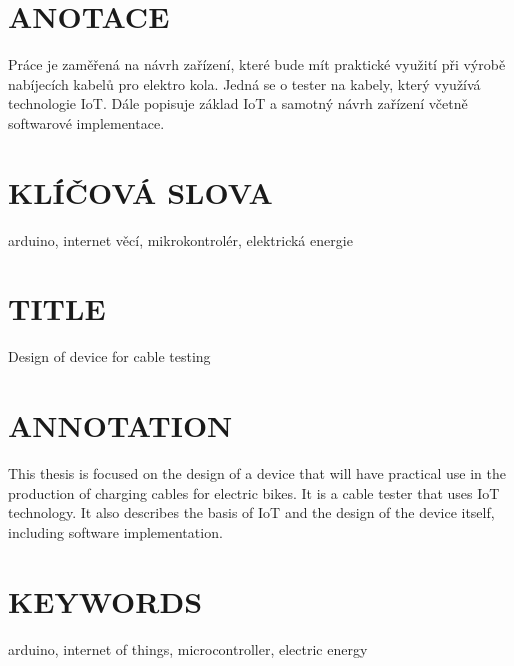 
\section*{ANOTACE}
Práce je zaměřená na návrh zařízení, které bude mít praktické využití při výrobě nabíjecích kabelů pro elektro kola. Jedná se o tester na kabely, který využívá technologie IoT. Dále popisuje základ IoT a samotný návrh zařízení včetně softwarové implementace.

\section*{KLÍČOVÁ SLOVA}
arduino, internet věcí, mikrokontrolér, elektrická energie
\section*{TITLE}
Design of device for cable testing

\section*{ANNOTATION}
This thesis is focused on the design of a device that will have practical use in the production of charging cables for electric bikes. It is a cable tester that uses IoT technology. It also describes the basis of IoT and the design of the device itself, including software implementation.

\section*{KEYWORDS}
arduino, internet of things, microcontroller, electric energy

